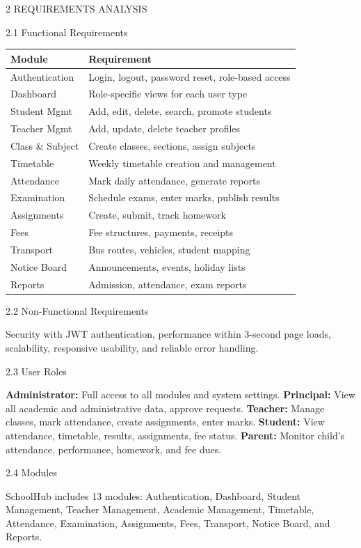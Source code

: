 2  REQUIREMENTS ANALYSIS

2.1  Functional Requirements

\begin{tabular}{|p{2.5cm}|p{9.5cm}|}
\hline
\textbf{Module} & \textbf{Requirement} \\ \hline
Authentication & Login, logout, password reset, role-based access \\ \hline
Dashboard & Role-specific views for each user type \\ \hline
Student Mgmt & Add, edit, delete, search, promote students \\ \hline
Teacher Mgmt & Add, update, delete teacher profiles \\ \hline
Class \& Subject & Create classes, sections, assign subjects \\ \hline
Timetable & Weekly timetable creation and management \\ \hline
Attendance & Mark daily attendance, generate reports \\ \hline
Examination & Schedule exams, enter marks, publish results \\ \hline
Assignments & Create, submit, track homework \\ \hline
Fees & Fee structures, payments, receipts \\ \hline
Transport & Bus routes, vehicles, student mapping \\ \hline
Notice Board & Announcements, events, holiday lists \\ \hline
Reports & Admission, attendance, exam reports \\ \hline
\end{tabular}

2.2  Non-Functional Requirements

Security with JWT authentication, performance within 3-second page loads, scalability, responsive usability, and reliable error handling.

2.3  User Roles

\textbf{Administrator:} Full access to all modules and system settings. \textbf{Principal:} View all academic and administrative data, approve requests. \textbf{Teacher:} Manage classes, mark attendance, create assignments, enter marks. \textbf{Student:} View attendance, timetable, results, assignments, fee status. \textbf{Parent:} Monitor child's attendance, performance, homework, and fee dues.

2.4  Modules

SchoolHub includes 13 modules: Authentication, Dashboard, Student Management, Teacher Management, Academic Management, Timetable, Attendance, Examination, Assignments, Fees, Transport, Notice Board, and Reports.
